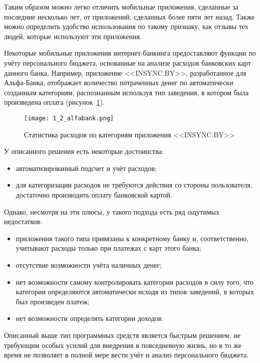 Таким образом можно легко отличить мобильные приложения, сделанные за последние несколько лет, от приложений, сделанных более пяти лет назад.
Также можно определить удобство использования по такому признаку, как отзывы тех людей, которые используют эти приложения.

Некоторые мобильные приложения интернет-банкинга предоставляют функции по учёту персонального бюджета, основанные на анализе расходов банковских карт данного банка.
Например, приложение <<INSYNC.BY>>, разработанное для Альфа-Банка, отображает количество потраченных денег по автоматически созданным категориям, распознанным используя тип заведения, в котором была произведена оплата (рисунок~\ref{fig:analysis:analogues:alfabank}).

\begin{figure}[h]
    \centering
    \texttt{[image: 1\_2\_alfabank.png]}
    \caption{Статистика расходов по категориям приложения <<INSYNC.BY>>}
    \label{fig:analysis:analogues:alfabank}
\end{figure}

У описанного решения есть некоторые достоинства:
\begin{itemize}
    \item автоматизированный подсчет и учёт расходов;
    \item для категоризации расходов не требуются действия со стороны пользователя, достаточно производить оплату банковской картой.
\end{itemize}

Однако, несмотря на эти плюсы, у такого подхода есть ряд ощутимых недостатков:
\begin{itemize}
    \item приложения такого типа привязаны к конкретному банку и, соответственно, учитывают расходы только при платежах с карт этого банка;
    \item отсутствие возможности учёта наличных денег;
    \item нет возможности самому контролировать категории расходов в силу того, что категории определяются автоматически исходя из типов заведений, в которых был произведен платеж;
    \item нет возможности определять категории доходов.
\end{itemize}

Описанный выше тип программных средств является быстрым решением, не требующим особых усилий для внедрения в повседневную жизнь, но в то же время не позволяет в полной мере вести учёт и анализ персонального бюджета.

